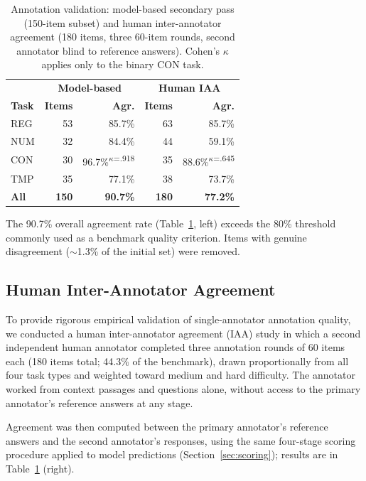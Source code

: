 \documentclass[11pt]{article}
\begin{document}
\begin{table}[t]
\centering\small
\begin{tabular}{lrrrr}
\toprule
 & \multicolumn{2}{c}{\textbf{Model-based}} & \multicolumn{2}{c}{\textbf{Human IAA}} \\
\textbf{Task} & \textbf{Items} & \textbf{Agr.} & \textbf{Items} & \textbf{Agr.} \\
\midrule
REG & 53 & 85.7\% & 63 & 85.7\% \\
NUM & 32 & 84.4\% & 44 & 59.1\% \\
CON & 30 & 96.7\%\textsuperscript{$\kappa$=.918} & 35 & 88.6\%\textsuperscript{$\kappa$=.645} \\
TMP & 35 & 77.1\% & 38 & 73.7\% \\
\midrule
\textbf{All} & \textbf{150} & \textbf{90.7\%} & \textbf{180} & \textbf{77.2\%} \\
\bottomrule
\end{tabular}
\caption{Annotation validation: model-based secondary pass (150-item subset) and human inter-annotator agreement (180 items, three 60-item rounds, second annotator blind to reference answers). Cohen's $\kappa$ applies only to the binary CON task.}
\label{tab:validation}
\end{table}

The 90.7\% overall agreement rate (Table~\ref{tab:validation}, left) exceeds the 80\% threshold commonly used as a benchmark quality criterion. Items with genuine disagreement ($\sim$1.3\% of the initial set) were removed.

\subsection{Human Inter-Annotator Agreement}
\label{sec:iaa}

To provide rigorous empirical validation of single-annotator annotation quality, we conducted a human inter-annotator agreement (IAA) study in which a second independent human annotator completed three annotation rounds of 60 items each (180 items total; 44.3\% of the benchmark), drawn proportionally from all four task types and weighted toward medium and hard difficulty. The annotator worked from context passages and questions alone, without access to the primary annotator's reference answers at any stage.

Agreement was then computed between the primary annotator's reference answers and the second annotator's responses, using the same four-stage scoring procedure applied to model predictions (Section~\ref{sec:scoring}); results are in Table~\ref{tab:validation} (right).
\end{document}
